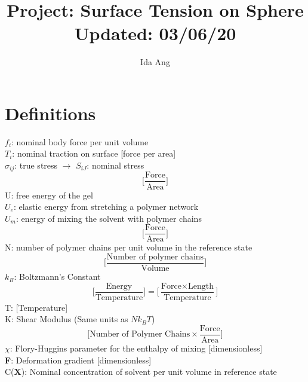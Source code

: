 \documentclass[12pt,3p]{article}
\numberwithin{equation}{section}
\begin{document}
\title{Project: Surface Tension on Sphere \\
	\large{Updated: 03/06/20}}
\author{Ida Ang}
\date{\vspace{-5ex}}
\maketitle

\tableofcontents
\newpage

\section{Definitions}
$f_i$: nominal body force per unit volume \\
$T_i$: nominal traction on surface [force per area] \\
$\sigma_{ij}$: true stress $\rightarrow$ $S_{iJ}$: nominal stress 
\begin{equation*}
\bigg[ \frac{\text{Force}}{\text{Area}} \bigg] 
\end{equation*}
U: free energy of the gel \\
	\indent 
	$U_e$: elastic energy from stretching a polymer network \\
	\indent
	$U_m$: energy of mixing the solvent with polymer chains
\begin{equation*}
\bigg[ \frac{\text{Force}}{\text{Area}} \bigg] 
\end{equation*}
N: number of polymer chains per unit volume in the reference state 
\begin{equation*}
\bigg[ \frac{\text{Number of polymer chains}}{\text{Volume}} \bigg]
\end{equation*}
$k_B$: Boltzmann's Constant
\begin{equation*}
\bigg[ \frac{\text{Energy}}{\text{Temperature}} \bigg] = \bigg[ \frac{\text{Force} \times \text{Length}}{\text{Temperature}} \bigg] 
\end{equation*}
T: [Temperature] \\
K: Shear Modulus (Same units as $N k_B T$)
\begin{equation*}
\bigg[\text{Number of Polymer Chains} \times \frac{\text{Force}}{\text{Area}} \bigg] 
\end{equation*}
$\chi$: Flory-Huggins parameter for the enthalpy of mixing [dimensionless] \\
\textbf{F}: Deformation gradient [dimensionless] \\
C(\textbf{X}): Nominal concentration of solvent per unit volume in reference state \\
\end{document}
